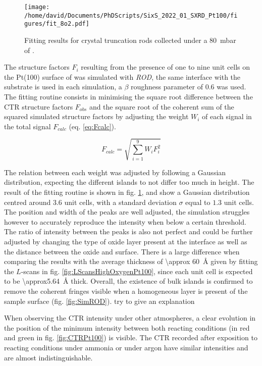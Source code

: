 \begin{figure}[!htb]
    \centering
    \texttt{[image: /home/david/Documents/PhDScripts/SixS\_2022\_01\_SXRD\_Pt100/figures/fit\_8o2.pdf]}
    \caption{
        Fitting results for crystal truncation rods collected under a \qty{80}{\milli\bar} of .
    }
    \label{fig:CTRFitHighOxygen}
\end{figure}

The structure factors $F_i$ resulting from the presence of one to nine unit cells on the Pt(100) surface of  was simulated with \textit{ROD}, the same interface with the substrate is used in each simulation, a $\beta$ roughness parameter of 0.6 was used.
The fitting routine consists in minimising the square root difference between the CTR structure factors $F_{obs}$ and the square root of the coherent sum of the squared simulated structure factors by adjusting the weight $W_i$ of each signal in the total signal $F_{calc}$ (eq. \ref{eq:Fcalc}).

\begin{equation}
    F_{calc} = \sqrt{\sum_{i=1}^{9} W_i F_i^2}
    \label{eq:Fcalc}
\end{equation}

The relation between each weight was adjusted by following a Gaussian distribution, expecting the different islands to not differ too much in height.
The result of the fitting routine is shown in fig. \ref{fig:CTRFitHighOxygen}, and show a Gaussian distribution centred around $3.6$ unit cells, with a standard deviation $\sigma$ equal to $1.3$ unit cells.
The position and width of the  peaks are well adjusted, the simulation struggles however to accurately reproduce the intensity when below a certain threshold.
The ratio of intensity between the  peaks is also not perfect and could be further adjusted by changing the type of oxide layer present at the interface as well as the distance between the oxide and surface.
There is a large difference when comparing the results with the average thickness of \qty{\approx 60}{\angstrom} given by fitting the $L$-scans in fig. \ref{fig:LScansHighOxygenPt100}, since each unit cell is expected to be \qty{\approx5.64}{\angstrom} thick.
Overall, the existence of bulk  islands is confirmed to remove the coherent fringes visible when a homogeneous layer is present of the sample surface (fig. \ref{fig:SimROD}).
\textcolor{Important}{try to give an explanation}

When observing the CTR intensity under other atmospheres, a clear evolution in the position of the minimum intensity between both reacting conditions (in red and green in fig. \ref{fig:CTRPt100}) is visible.
The CTR recorded after exposition to reacting conditions under ammonia or under argon have similar intensities and are almost indistinguishable.

